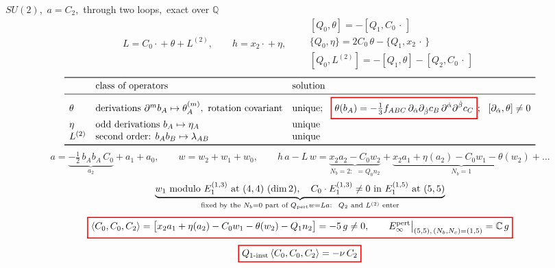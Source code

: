 \documentclass[10pt]{article}
\newcommand{\tagbox}[1]{\fbox{\footnotesize #1}}
\newcommand{\sred}[1]{{\setlength{\fboxrule}{1.1pt}\fcolorbox{red}{white}{$\displaystyle #1$}}}
\begin{document}
\tagbox{computed}\quad $SU(2)$,\ $a=C_2$,\ through two loops,\ exact over $\mathbb Q$
\[
L=C_0\cdot{}+\theta+L^{(2)},\qquad h=x_2\cdot{}+\eta,\qquad
\begin{array}{l}
{}[Q_0,\theta]=-[Q_1,C_0\,\cdot\,]\\
\{Q_0,\eta\}=2C_0\,\theta-\{Q_1,x_2\,\cdot\,\}\\
{}[Q_0,L^{(2)}]=-[Q_1,\theta]-[Q_2,C_0\,\cdot\,]
\end{array}
\]
\[
\begin{array}{lll}
\toprule
 & \text{class of operators} & \text{solution}\\\midrule
\theta & \text{derivations }\partial^mb_A\mapsto\theta_A^{(m)},\ \text{rotation covariant} & \text{unique};\ \ \sred{\theta(b_A)=-\tfrac13f_{ABC}\,\partial_{\dot\alpha}\partial_{\dot\beta}c_B\,\partial^{\dot\alpha}\partial^{\dot\beta}c_C};\ \ [\partial_{\dot\alpha},\theta]\neq0\\
\eta & \text{odd derivations }b_A\mapsto\eta_A & \text{unique}\\
L^{(2)} & \text{second order: }b_Ab_B\mapsto\lambda_{AB} & \text{unique}\\\bottomrule
\end{array}
\]
\[
a=\underbrace{-\tfrac12\,b_Ab_A\,C_0}_{a_2}+a_1+a_0,\qquad w=w_2+w_1+w_0,\qquad
h\,a-L\,w=\underbrace{x_2a_2-C_0w_2}_{N_b=2:\ \ =Q_0n_2}+\underbrace{x_2a_1+\eta(a_2)-C_0w_1-\theta(w_2)}_{N_b=1}+\dots
\]
\[
\underbrace{w_1\ \text{modulo}\ E_1^{(1,3)}\text{ at }(4,4)\ (\dim2),\quad C_0\cdot E_1^{(1,3)}\neq0\ \text{in}\ E_1^{(1,5)}\text{ at }(5,5)}_{\text{fixed by the }N_b=0\text{ part of }Q_{\rm pert}w=La:\ \ Q_2\text{ and }L^{(2)}\text{ enter}}
\]
\[
\sred{\langle C_0,C_0,C_2\rangle=\big[x_2a_1+\eta(a_2)-C_0w_1-\theta(w_2)-Q_1n_2\big]=-5\,g\neq0,\qquad E_\infty^{\rm pert}\big|_{(5,5),\,(N_b,N_c)=(1,5)}=\mathbb C\,g}
\]
\[
\sred{Q_{1\text{-inst}}\,\langle C_0,C_0,C_2\rangle=-\nu\,C_2}
\]
\end{document}
